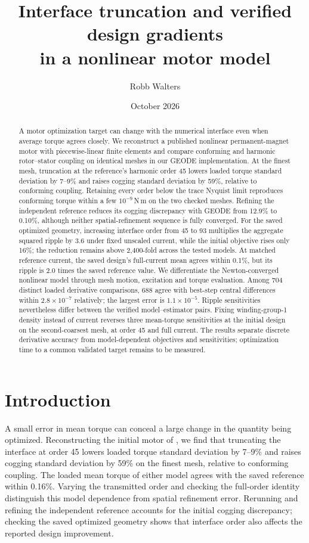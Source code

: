 \documentclass{anvil-paper}
\title{Interface truncation and verified design gradients\\
in a nonlinear motor model}
\author{Robb Walters}
\date{October 2026}
\begin{document}
\maketitle
\begin{abstract}
A motor optimization target can change with the numerical interface even
when average torque agrees closely. We reconstruct a published nonlinear
permanent-magnet motor with piecewise-linear finite elements and compare
conforming and harmonic rotor--stator coupling on identical meshes in our
GEODE implementation.
At the finest mesh, truncation at the reference's harmonic order 45 lowers
loaded torque standard deviation by 7--9\% and raises cogging standard
deviation by 59\%, relative to conforming coupling. Retaining every order
below the trace Nyquist limit reproduces conforming torque within a few
$10^{-9}$\,N\,m on the two checked meshes. Refining the independent reference
reduces its cogging discrepancy with GEODE from 12.9\% to 0.10\%, although neither spatial-refinement sequence is fully converged.
For the saved optimized geometry, increasing interface order from 45 to 93
multiplies the aggregate squared ripple by 3.6 under fixed unscaled current,
while the initial objective rises only 16\%; the reduction remains above
2,400-fold across the tested models. At matched reference current, the
saved design's full-current mean agrees within 0.1\%, but its ripple is
2.0 times the saved reference value. We differentiate the Newton-converged nonlinear model through
mesh motion, excitation and torque evaluation. Among 704 distinct loaded
derivative comparisons, 688 agree with best-step central differences within
$2.8\times10^{-7}$ relatively; the largest error is $1.1\times10^{-5}$.
Ripple sensitivities nevertheless differ between the verified
model--estimator pairs. Fixing winding-group-1 density instead of current
reverses three mean-torque sensitivities at the initial design on the second-coarsest mesh, at order 45 and
full current.
The results separate discrete derivative accuracy from model-dependent
objectives and sensitivities; optimization time to a common validated
target remains to be measured.

\end{abstract}

\section{Introduction}
A small error in mean torque can conceal a large change in the quantity
being optimized. Reconstructing the initial motor of
\citet{wiesheu2024spline}, we find that truncating the interface at order 45
lowers loaded torque standard deviation by 7--9\% and raises cogging
standard deviation by 59\% on the finest mesh, relative to conforming coupling. The loaded
mean torque of either model agrees with the saved reference within 0.16\%.
Varying the transmitted order and checking the full-order identity
distinguish this model dependence from spatial refinement error. Rerunning
and refining the independent reference accounts for the initial cogging
discrepancy; checking the saved optimized geometry shows that interface
order also affects the reported design improvement.
\end{document}
